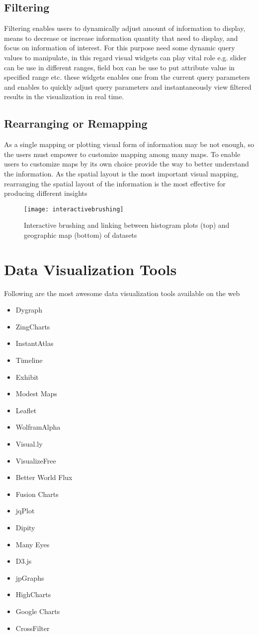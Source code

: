 \subsection{Filtering}
Filtering enables users to dynamically adjust amount of information to display, means to decrease or increase information quantity that need to display, and focus on information of interest. For this purpose need some dynamic query values to manipulate, in this regard visual widgets can play vital role e.g. slider can be use in different ranges, field box can be use to put attribute value in specified range etc. these widgets enables one from the current query parameters and enables to quickly adjust query parameters and instantaneously view filtered results in the visualization in real time.
\subsection{Rearranging or Remapping}
As a single mapping or plotting visual form of information may be not enough, so the users must empower to customize mapping among many maps. To enable users to customize maps by its own choice provide the way to better understand the information. As the spatial layout is the most important visual mapping, rearranging the spatial layout of the information is the most effective for producing different insights
\begin{figure}[h]
	\texttt{[image: interactivebrushing]}
	\centering
	\caption{Interactive brushing and linking between histogram plots (top) and geographic map (bottom) of datasets}
\end{figure}
\section{Data Visualization Tools}
Following are the most awesome data visualization tools available on the web
\begin{multicols}{3}
\begin{itemize}
	\item Dygraph
	\item ZingCharts
	\item InstantAtlas
	\item Timeline
	\item Exhibit
	\item Modest Maps
	\item Leaflet
	\item WolframAlpha
	\item Visual.ly
	\item VisualizeFree
	\item Better World Flux
	\item Fusion Charts
	\item jqPlot
	\item Dipity
	\item Many Eyes
	\item D3.js
	\item jpGraphs
	\item HighCharts
	\item Google Charts
	\item CrossFilter
\end{itemize}
\end{multicols}
